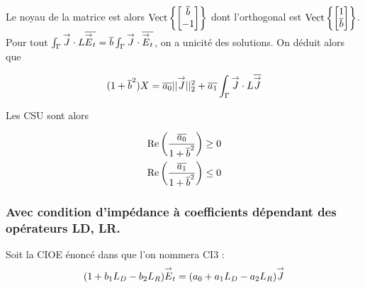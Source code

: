 		Le noyau de la matrice est alors \(\operatorname{Vect}\left\lbrace\begin{bmatrix}{\overline{b}}\\-1\end{bmatrix}\right\rbrace\) dont l'orthogonal est  \(\operatorname{Vect}\left\lbrace\begin{bmatrix}1\\{\overline{b}}\end{bmatrix}\right\rbrace\).
		Pour tout \(\int_\Gamma {\overset{\rightarrow}{J}}\cdot L{\overline{{\overset{\rightarrow}{E}}_t}} = {\overline{b}} \int_\Gamma {\overset{\rightarrow}{J}} \cdot {\overline{{\overset{\rightarrow}{E}}_t}} \), on a unicité des solutions. On déduit alors que

		\[
			(1 + {\overline{b}}^2) X = {\overline{a_0}} ||{\overset{\rightarrow}{J}}||_2^2 + {\overline{a_1}}\int_\Gamma {\overset{\rightarrow}{J}} \cdot L{\overline{{\overset{\rightarrow}{J}}}}
		\]

		Les CSU sont alors

		\begin{align}
			\operatorname{Re}\left(\dfrac{{\overline{a_0}}}{1 + {\overline{b}}^2}\right) &\ge 0 \\
			\operatorname{Re}\left(\dfrac{{\overline{a_1}}}{1 + {\overline{b}}^2}\right) &\le 0
		\end{align}






		\subsubsection{Avec condition d'impédance à coefficients dépendant des opérateurs LD, LR.}

			Soit la CIOE énoncé dans \cite{soudais_3d_2017} que l'on nommera CI3 :
			\begin{equation}
				\label{eq:unicite:ci3:ci3}
				( 1 + b_1 L_D - b_2 L_R){\overset{\rightarrow}{E}}_t = (a_0 + a_1 L_D - a_2 L_R ) {\overset{\rightarrow}{J}}
			\end{equation}


